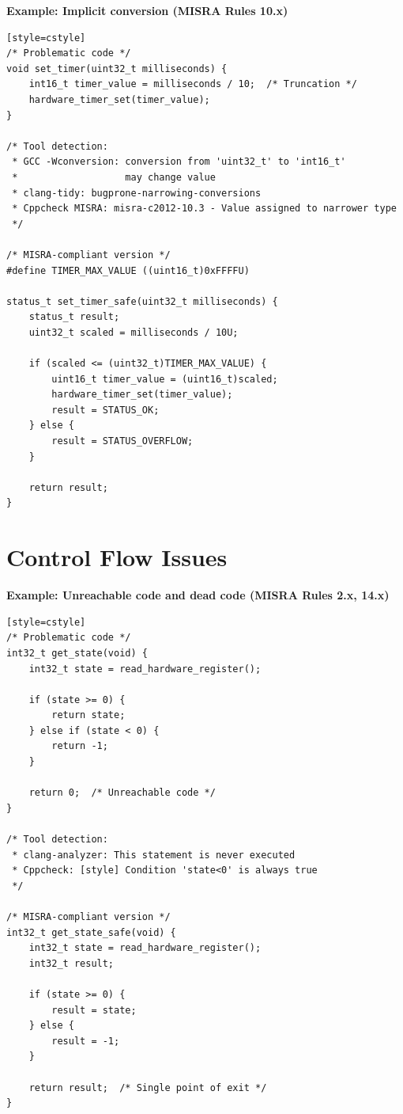 \documentclass[11pt,letterpaper]{report}
\begin{document}
\textbf{Example: Implicit conversion (MISRA Rules 10.x)}

\begin{verbatim}[style=cstyle]
/* Problematic code */
void set_timer(uint32_t milliseconds) {
    int16_t timer_value = milliseconds / 10;  /* Truncation */
    hardware_timer_set(timer_value);
}

/* Tool detection:
 * GCC -Wconversion: conversion from 'uint32_t' to 'int16_t'
 *                   may change value
 * clang-tidy: bugprone-narrowing-conversions
 * Cppcheck MISRA: misra-c2012-10.3 - Value assigned to narrower type
 */

/* MISRA-compliant version */
#define TIMER_MAX_VALUE ((uint16_t)0xFFFFU)

status_t set_timer_safe(uint32_t milliseconds) {
    status_t result;
    uint32_t scaled = milliseconds / 10U;

    if (scaled <= (uint32_t)TIMER_MAX_VALUE) {
        uint16_t timer_value = (uint16_t)scaled;
        hardware_timer_set(timer_value);
        result = STATUS_OK;
    } else {
        result = STATUS_OVERFLOW;
    }

    return result;
}
\end{verbatim}

\section{Control Flow Issues}

\textbf{Example: Unreachable code and dead code (MISRA Rules 2.x, 14.x)}

\begin{verbatim}[style=cstyle]
/* Problematic code */
int32_t get_state(void) {
    int32_t state = read_hardware_register();

    if (state >= 0) {
        return state;
    } else if (state < 0) {
        return -1;
    }

    return 0;  /* Unreachable code */
}

/* Tool detection:
 * clang-analyzer: This statement is never executed
 * Cppcheck: [style] Condition 'state<0' is always true
 */

/* MISRA-compliant version */
int32_t get_state_safe(void) {
    int32_t state = read_hardware_register();
    int32_t result;

    if (state >= 0) {
        result = state;
    } else {
        result = -1;
    }

    return result;  /* Single point of exit */
}
\end{verbatim}
\end{document}
